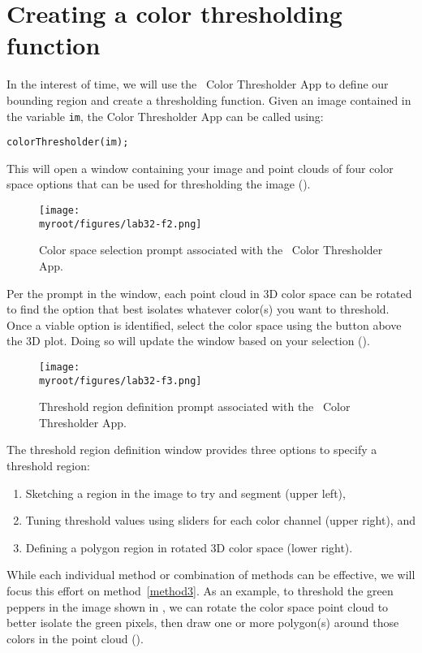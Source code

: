 \documentclass{tufte-handout}
\newcommand{\myroot}{../..}
\begin{document}
\section{Creating a color thresholding function}
In the interest of time, we will use the \Matlab\ Color Thresholder App to define our bounding region and create a thresholding function. Given an image contained in the variable \lstinline{im}, the Color Thresholder App can be called using:
\begin{lstlisting}[style=usnaMatlab]
colorThresholder(im);
\end{lstlisting}
This will open a window containing your image and point clouds of four color space options that can be used for thresholding the image (). 
\begin{figure}
\begin{center}
\texttt{[image: \\myroot/figures/lab32-f2.png]}
\end{center}
\caption{Color space selection prompt associated with the \Matlab\ Color Thresholder App.}
\label{fig:2}
\end{figure}

Per the prompt in the window, each point cloud in 3D color space can be rotated to find the option that best isolates whatever color(s) you want to threshold. Once a viable option is identified, select the color space using the button above the 3D plot. Doing so will update the window based on your selection (). 

\begin{figure}
\begin{center}
\texttt{[image: \\myroot/figures/lab32-f3.png]}
\end{center}
\caption{Threshold region definition prompt associated with the \Matlab\ Color Thresholder App.}
\label{fig:3}
\end{figure}
The threshold region definition window provides three options to specify a threshold region:
\begin{enumerate}
\item Sketching a region in the image to try and segment (upper left), 
\item Tuning threshold values using sliders for each color channel (upper right), and 
\item\label{method3} Defining a polygon region in rotated 3D color space (lower right). 
\end{enumerate}
While each individual method or combination of methods can be effective, we will focus this effort on method~\ref{method3}. As an example, to threshold the green peppers in the image shown in , we can rotate the color space point cloud to better isolate the green pixels, then draw one or more polygon(s) around those colors in the point cloud (). 
\end{document}
